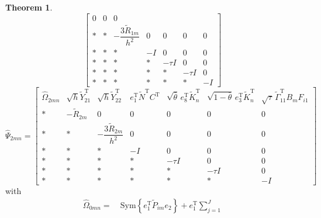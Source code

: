 \documentclass[preprint,review,fleqn,sort&compress,3p]{elsarticle}
\theoremstyle{definition} %
\theoremstyle{definition}%
\newtheorem{thm}{Theorem}[section]
\begin{document}
\begin{thm}
\begin{equation}
\begin{bmatrix}
				0
				&
				0
				&
				0
				\\[1.5ex]
				*
				&
				*
				&
				-\dfrac{3\widetilde R_{1m}}{h^2}
				&
				0
				&
				0
				&
				0
				&
				0
				\\[1.5ex]
				*
				&
				*
				&
				*
				&
				-I
				&
				0
				&
				0
				&
				0
				\\[1.5ex]
				*
				&
				*
				&
				*
				&
				*
				&
				-\tau I
				&
				0
				&
				0
				\\[1.5ex]
				*
				&
				*
				&
				*
				&
				*
				&
				*
				&
				-\tau I
				&
				0
				\\[1.5ex]
				*
				&
				*
				&
				*
				&
				*
				&
				*
				&
				*
				&
				-I
			\end{bmatrix}
		\end{equation}
		\begin{equation}\label{LMI2_hat}
			\widehat{\Psi}_{2mn}=
			\begin{bmatrix}
				\widehat{\Omega}_{2mn}
				&
				\sqrt{h} \widetilde Y_{21}^{\mathrm{T}}
				&
				\sqrt{h} \widetilde Y_{22}^{\mathrm{T}}
				&
				e_1^{\mathrm{T}}\widetilde N^{\mathrm{T}}C^{\mathrm{T}}
				&
				\sqrt{\bar\theta}\,e_8^{\mathrm{T}}\widetilde K_n^{\mathrm{T}}
				&
				\sqrt{1-\bar\theta}\,e_3^{\mathrm{T}}\widetilde K_n^{\mathrm{T}}
				&
				\sqrt{\tau}\,
				\widetilde{\Gamma}_{11}^{\mathrm{T}}
				B_mF_{i1}
				\\[1.5ex]
				*
				&
				-\widetilde R_{2m}
				&
				0
				&
				0
				&
				0
				&
				0
				&
				0
				\\[1.5ex]
				*
				&
				*
				&
				-\dfrac{3\widetilde R_{2m}}{h^2}
				&
				0
				&
				0
				&
				0
				&
				0
				\\[1.5ex]
				*
				&
				*
				&
				*
				&
				-I
				&
				0
				&
				0
				&
				0
				\\[1.5ex]
				*
				&
				*
				&
				*
				&
				*
				&
				-\tau I
				&
				0
				&
				0
				\\[1.5ex]
				*
				&
				*
				&
				*
				&
				*
				&
				*
				&
				-\tau I
				&
				0
				\\[1.5ex]
				*
				&
				*
				&
				*
				&
				*
				&
				*
				&
				*
				&
				-I
			\end{bmatrix}
		\end{equation}
		with
		\begin{align*}
			\widehat{\Omega}_{0mn}
			=&\
			\mathrm{Sym}\left\{
			e_1^{\mathrm{T}}\widetilde{P}_{im}e_2
			\right\}
			+
			e_1^{\mathrm{T}}
			\sum_{j=1}^{J}

\end{align*}
\end{thm}
\end{document}
